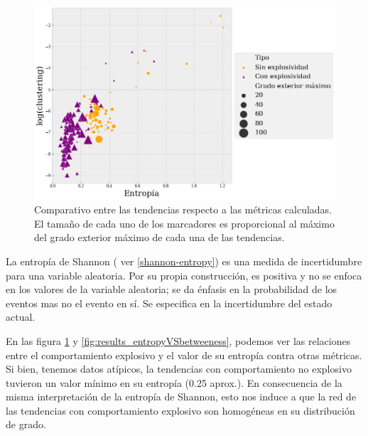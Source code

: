 \documentclass[../main.tex]{subfiles}
\begin{document}
\begin{figure}[h!]
    \centering
    \includegraphics[scale = 0.40]{images/results_entropyVSclustering.png}
    \caption{Comparativo entre las tendencias respecto a las métricas calculadas. El tamaño de cada uno de los marcadores es proporcional al máximo del grado exterior máximo de cada una de las tendencias. }
    \label{fig:results_entropyVSclustering}
\end{figure}

La entropía de Shannon ( ver \ref{shannon-entropy}) es una medida de incertidumbre para una variable aleatoria. Por su propia construcción, es positiva  y  no se enfoca en los valores de la variable aleatoria; se da énfasis en la probabilidad de los eventos mas no el evento en sí. Se especifica en la incertidumbre del estado actual.


En las figura \ref{fig:results_entropyVSclustering} y \ref{fig:results_entropyVSbetweeness}, podemos ver las relaciones entre el comportamiento explosivo y el valor de su entropía contra otras métricas. Si bien, tenemos datos atípicos, la tendencias con comportamiento no explosivo tuvieron un valor mínimo en su entropía (0.25 aprox.). En consecuencia de la misma interpretación de la entropía de Shannon, esto nos induce a que la red de las tendencias con comportamiento explosivo son homogéneas en su distribución de grado.
\end{document}
